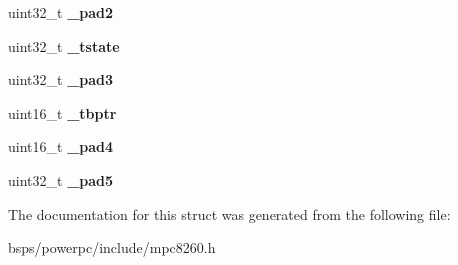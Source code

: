 \begin{DoxyCompactItemize}
\mbox{\label{structm8260SPIparms___a2744007061df941bc1cf035297271018}} 
uint32\+\_\+t {\bfseries \+\_\+pad2}
\item 
\mbox{\label{structm8260SPIparms___a2e63bbd230e5c7a11d7697bd95bd40d6}} 
uint32\+\_\+t {\bfseries \+\_\+tstate}
\item 
\mbox{\label{structm8260SPIparms___ab06d42b3d667dd04f511532585500bb9}} 
uint32\+\_\+t {\bfseries \+\_\+pad3}
\item 
\mbox{\label{structm8260SPIparms___afe26183de776c4c9f1a4fe8afc904acb}} 
uint16\+\_\+t {\bfseries \+\_\+tbptr}
\item 
\mbox{\label{structm8260SPIparms___af34550aa3944501b7187495dcbe8364f}} 
uint16\+\_\+t {\bfseries \+\_\+pad4}
\item 
\mbox{\label{structm8260SPIparms___ae1caaf85d93e03bdebe8c54d903d1f31}} 
uint32\+\_\+t {\bfseries \+\_\+pad5}
\end{DoxyCompactItemize}


The documentation for this struct was generated from the following file\+:\begin{DoxyCompactItemize}
\item 
bsps/powerpc/include/mpc8260.\+h\end{DoxyCompactItemize}
